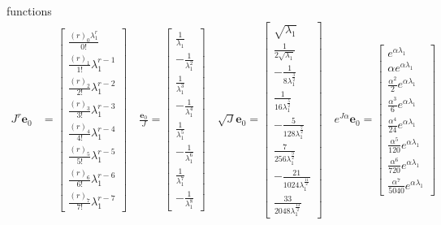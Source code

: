 functions
\begin{displaymath}
\begin{split}
J^{r} \boldsymbol{e}_{0} &= \left[\begin{matrix}\frac{{\left(r\right)}_{0} \lambda_{1}^{r}}{0!}\\\frac{{\left(r\right)}_{1}}{1!} \lambda_{1}^{r - 1}\\\frac{{\left(r\right)}_{2}}{2!} \lambda_{1}^{r - 2}\\\frac{{\left(r\right)}_{3}}{3!} \lambda_{1}^{r - 3}\\\frac{{\left(r\right)}_{4}}{4!} \lambda_{1}^{r - 4}\\\frac{{\left(r\right)}_{5}}{5!} \lambda_{1}^{r - 5}\\\frac{{\left(r\right)}_{6}}{6!} \lambda_{1}^{r - 6}\\\frac{{\left(r\right)}_{7}}{7!} \lambda_{1}^{r - 7}\end{matrix}\right]\quad
\frac{\boldsymbol{e}_{0}}{J} = \left[\begin{matrix}\frac{1}{\lambda_{1}}\\- \frac{1}{\lambda_{1}^{2}}\\\frac{1}{\lambda_{1}^{3}}\\- \frac{1}{\lambda_{1}^{4}}\\\frac{1}{\lambda_{1}^{5}}\\- \frac{1}{\lambda_{1}^{6}}\\\frac{1}{\lambda_{1}^{7}}\\- \frac{1}{\lambda_{1}^{8}}\end{matrix}\right]\quad
\sqrt{J} \boldsymbol{e}_{0} = \left[\begin{matrix}\sqrt{\lambda_{1}}\\\frac{1}{2 \sqrt{\lambda_{1}}}\\- \frac{1}{8 \lambda_{1}^{\frac{3}{2}}}\\\frac{1}{16 \lambda_{1}^{\frac{5}{2}}}\\- \frac{5}{128 \lambda_{1}^{\frac{7}{2}}}\\\frac{7}{256 \lambda_{1}^{\frac{9}{2}}}\\- \frac{21}{1024 \lambda_{1}^{\frac{11}{2}}}\\\frac{33}{2048 \lambda_{1}^{\frac{13}{2}}}\end{matrix}\right] \quad
e^{J \alpha} \boldsymbol{e}_{0} = \left[\begin{matrix}e^{\alpha \lambda_{1}}\\\alpha e^{\alpha \lambda_{1}}\\\frac{\alpha^{2}}{2} e^{\alpha \lambda_{1}}\\\frac{\alpha^{3}}{6} e^{\alpha \lambda_{1}}\\\frac{\alpha^{4}}{24} e^{\alpha \lambda_{1}}\\\frac{\alpha^{5}}{120} e^{\alpha \lambda_{1}}\\\frac{\alpha^{6}}{720} e^{\alpha \lambda_{1}}\\\frac{\alpha^{7}}{5040} e^{\alpha \lambda_{1}}\end{matrix}\right] \\

\end{split}
\end{displaymath}
